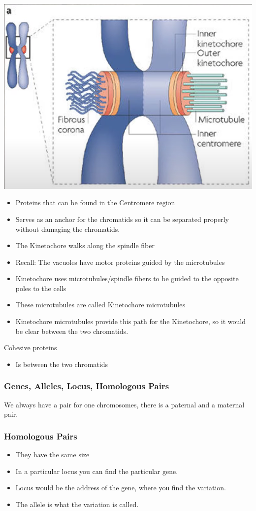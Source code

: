 \documentclass{article}
\begin{document}
\includegraphics[scale=0.3]{kinetochore.png}
\begin{itemize}
    \item Proteins that can be found in the Centromere region
    \item Serves as an anchor for the chromatids so it can be separated properly without damaging the chromatids.
    \item The Kinetochore walks along the spindle fiber
    \item Recall: The vacuoles have motor proteins guided by the microtubules
    \item Kinetochore uses microtubules/spindle fibers to be guided to the opposite poles to the cells
    \item These microtubules are called Kinetochore microtubules
    \item Kinetochore microtubules provide this path for the Kinetochore, so it would be clear between the two chromatids.
\end{itemize}
Cohesive proteins
\begin{itemize}
    \item Is between the two chromatids
\end{itemize}
\subsubsection*{Genes, Alleles, Locus, Homologous Pairs}
We always have a pair for one chromosomes, there is a paternal and a maternal pair.
\subsubsection*{Homologous Pairs}
\begin{itemize}
    \item They have the same size
    \item In a particular locus you can find the particular gene.
    \item Locus would be the address of the gene, where you find the variation.
    \item The allele is what the variation is called.
\end{itemize}
\end{document}
